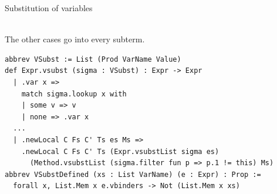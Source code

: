 \begin{cmp}{Substitution of variables}
\begin{paperside}
\\[1ex]
The other cases go into every subterm.
\end{paperside}
\begin{leanside}
\begin{lstlisting}[style=leanside]
abbrev VSubst := List (Prod VarName Value)
def Expr.vsubst (sigma : VSubst) : Expr -> Expr
  | .var x =>
    match sigma.lookup x with
    | some v => v
    | none => .var x
  ...
  | .newLocal C Fs C' Ts es Ms =>
    .newLocal C Fs C' Ts (Expr.vsubstList sigma es)
      (Method.vsubstList (sigma.filter fun p => p.1 != this) Ms)
abbrev VSubstDefined (xs : List VarName) (e : Expr) : Prop :=
  forall x, List.Mem x e.vbinders -> Not (List.Mem x xs)
\end{lstlisting}
\end{leanside}
\end{cmp}


